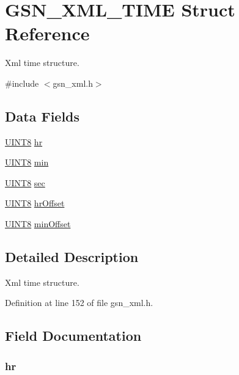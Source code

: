 \hypertarget{a00437}{
\section{GSN\_\-XML\_\-TIME Struct Reference}
\label{a00437}
}


Xml time structure.  




{\ttfamily \#include $<$gsn\_\-xml.h$>$}

\subsection*{Data Fields}
\begin{DoxyCompactItemize}
\item 
\hyperlink{a00660_gab27e9918b538ce9d8ca692479b375b6a}{UINT8} \hyperlink{a00437_a5dff479f0f1395e93a28dd0c7b1335b2}{hr}
\item 
\hyperlink{a00660_gab27e9918b538ce9d8ca692479b375b6a}{UINT8} \hyperlink{a00437_afcd3b3e11f0b83ec71d50a827e42d9db}{min}
\item 
\hyperlink{a00660_gab27e9918b538ce9d8ca692479b375b6a}{UINT8} \hyperlink{a00437_a2edad25d34a288a33b77f09dfc71faa5}{sec}
\item 
\hyperlink{a00660_gab27e9918b538ce9d8ca692479b375b6a}{UINT8} \hyperlink{a00437_aad11de9474bbeeed27b4986d738cf48e}{hrOffset}
\item 
\hyperlink{a00660_gab27e9918b538ce9d8ca692479b375b6a}{UINT8} \hyperlink{a00437_ab33c78dee679b2e12fbc4a8f3ae4c933}{minOffset}
\end{DoxyCompactItemize}


\subsection{Detailed Description}
Xml time structure. 

Definition at line 152 of file gsn\_\-xml.h.



\subsection{Field Documentation}
\hypertarget{a00437_a5dff479f0f1395e93a28dd0c7b1335b2}{
\subsubsection[{hr}]{ {\bf hr}}}
\label{a00437_a5dff479f0f1395e93a28dd0c7b1335b2}


